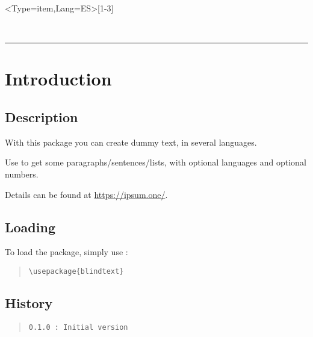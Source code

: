 \documentclass[11pt,a4paper]{ltxdoc}
\begin{document}
\begin{tcolorbox}[colframe=lightgray,colback=lightgray!5]
\ipsum<Type=item,Lang=ES>[1-3]
\end{tcolorbox}

\vfill~

\pagebreak


\hypertarget{matoc}{}

\tableofcontents

\vspace*{5mm}

\hrule

\vspace*{5mm}

\section{Introduction}

\subsection{Description}

With this package you can create dummy text, in several languages.

Use \cmd{\ipsum} to get some paragraphs/sentences/lists, with optional languages and optional numbers.

Details can be found at \url{https://ipsum.one/}.

\subsection{Loading}

To load the package, simply use :

\begin{quote}
\begin{verbatim}
\usepackage{blindtext}
\end{verbatim}
\end{quote}

\vfill

\subsection{History}

\begin{quote}
\begin{verbatim}
0.1.0 : Initial version
\end{verbatim}
\end{quote}
\end{document}
